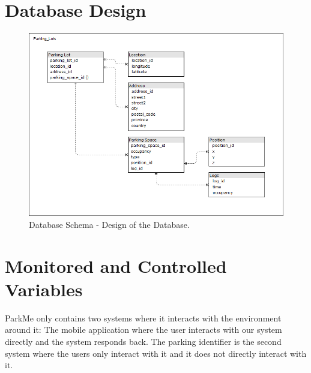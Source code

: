 \documentclass[]{article}
\begin{document}
	\section{Database Design}
	\begin{figure}[H]
		\centering
		\includegraphics[width=40em]{database.png}
		\caption{Database Schema - Design of the Database.}
		\label{fig:dd}
	\end{figure}
	
	
	\section{Monitored and Controlled Variables}
	ParkMe only contains two systems where it interacts with the environment around it: The mobile application where the user interacts with our system directly and the system responds back. The parking identifier is the second system where the users only interact with it and it does not directly interact with it.
	
\end{document}
